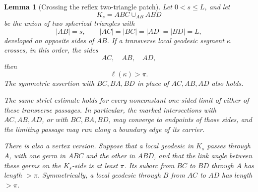 \documentclass[12pt,a4paper]{article}
\newtheorem{lemma}[theorem]{Lemma}
\theoremstyle{definition}
\begin{document}
\begin{lemma}[Crossing the reflex two-triangle patch]
\label{lem:reflex-patch-crossing}
Let \(0<s\le L\), and let
\[
        K_s=ABC\cup_{AB}ABD
\]
be the union of two spherical triangles with
\[
 |AB|=s,\qquad |AC|=|BC|=|AD|=|BD|=L,
\]
developed on opposite sides of \(AB\).  If a transverse local geodesic segment
\(\kappa\) crosses, in this order, the sides
\[
        AC,\quad AB,\quad AD,
\]
then
\[
        \ell(\kappa)>\pi.
\]
The symmetric assertion with \(BC,BA,BD\) in place of \(AC,AB,AD\) also
holds.

The same strict estimate holds for every nonconstant one-sided limit of either
of these transverse passages.  In particular, the marked intersections with
\(AC,AB,AD\), or with \(BC,BA,BD\), may converge to endpoints of those sides,
and the limiting passage may run along a boundary edge of its carrier.

There is also a vertex version. Suppose that a local geodesic in \(K_s\)
passes through \(A\), with one germ in \(ABC\) and the other in \(ABD\), and
that the link angle between these germs on the \(K_s\)-side is at least
\(\pi\). Its
subarc from \(BC\) to \(BD\) through \(A\) has length \(>\pi\).
Symmetrically, a local geodesic through \(B\) from \(AC\) to \(AD\) has
length \(>\pi\).
\end{lemma}
\end{document}

